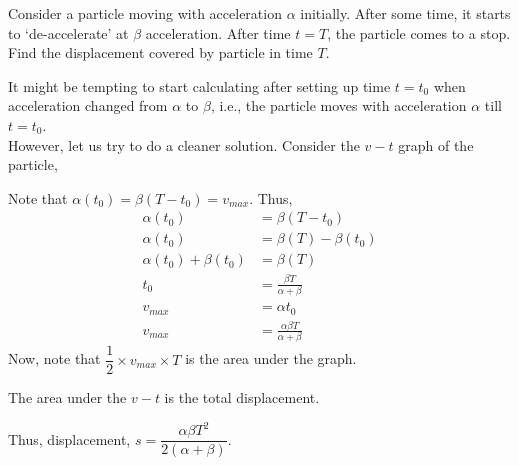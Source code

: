 \begin{example}
    Consider a particle moving with acceleration \(\alpha\) initially. After some time, it starts
    to `de-accelerate' at \(\beta\) acceleration. After time \(t = T\), the particle comes to a stop.
    Find the displacement covered by particle in time \(T\).
\begin{soln}
        It might be tempting to start calculating after setting up time \(t = t_0\) when acceleration
        changed from \(\alpha\) to \(\beta\), i.e., the particle moves with acceleration \(\alpha\) till
        \(t = t_0\).\\
        However, let us try to do a cleaner solution. Consider the \(v-t\) graph of the particle,

        \begin{figure}
            [H]
            \centering
        \end{figure}
        Note that \(\alpha(t_0) = \beta(T-t_0) = v_{max}\). Thus,
        \begin{align*}
            \alpha(t_0) &= \beta(T-t_0) \\
            \alpha(t_0) &= \beta(T) - \beta(t_0) \\
            \alpha(t_0) + \beta(t_0) &= \beta(T) \\
            t_0 &= \frac{\beta T}{\alpha + \beta} \\
            v_{max} &= \alpha t_0 \\
            v_{max} &= \frac{\alpha\beta T}{\alpha + \beta}
        \end{align*}
        Now, note that \(\dfrac{1}{2} \times v_{max} \times T\) is the area under the graph.
        \begin{moral}
            The area under the \(v-t\) is the total displacement.
        \end{moral}
        Thus, displacement, \(s = \dfrac{\alpha\beta T^2}{2(\alpha + \beta)}\).
\end{soln}
\end{example}

